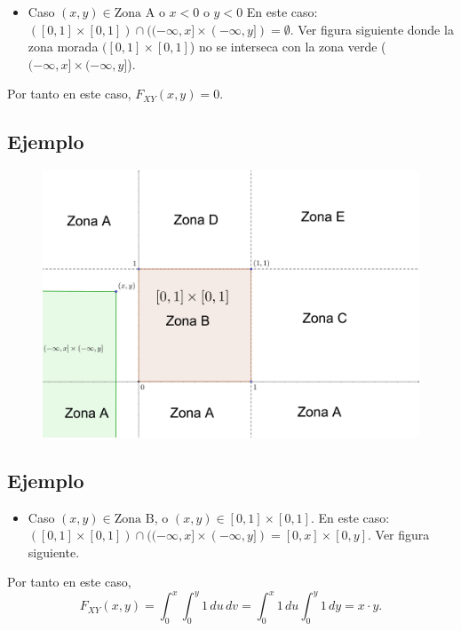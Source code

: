 \documentclass[]{book}
\providecommand{\tightlist}{%
  \setlength{\itemsep}{0pt}\setlength{\parskip}{0pt}}
\begin{document}
\begin{itemize}
\tightlist
\item
  Caso \((x,y)\in \mbox{Zona A}\) o \(x<0\) o \(y<0\) En este caso: \(([0,1]\times [0,1])\cap ((-\infty,x]\times (-\infty,y])=\emptyset.\) Ver figura siguiente donde la zona morada \(([0,1]\times [0,1]\)) no se interseca con la zona verde (\((-\infty,x]\times (-\infty,y]\)).
\end{itemize}

Por tanto en este caso, \(F_{XY}(x,y)=0\).

\hypertarget{ejemplo-45}{%
\subsection{Ejemplo}\label{ejemplo-45}}

\begin{figure}
\includegraphics[width=700px]{Images/VaUniformeBidi3} \end{figure}

\hypertarget{ejemplo-46}{%
\subsection{Ejemplo}\label{ejemplo-46}}

\begin{itemize}
\tightlist
\item
  Caso \((x,y)\in \mbox{Zona B}\), o \((x,y)\in [0,1]\times [0,1]\). En este caso: \(([0,1]\times [0,1])\cap ((-\infty,x]\times (-\infty,y])=[0,x]\times [0,y].\) Ver figura siguiente.
\end{itemize}

Por tanto en este caso,
\[
F_{XY}(x,y)=\int_0^x \int_0^y 1\,du\,dv =\int_0^x 1\, du\int_0^y 1\, dy =x\cdot y.
\]
\end{document}
